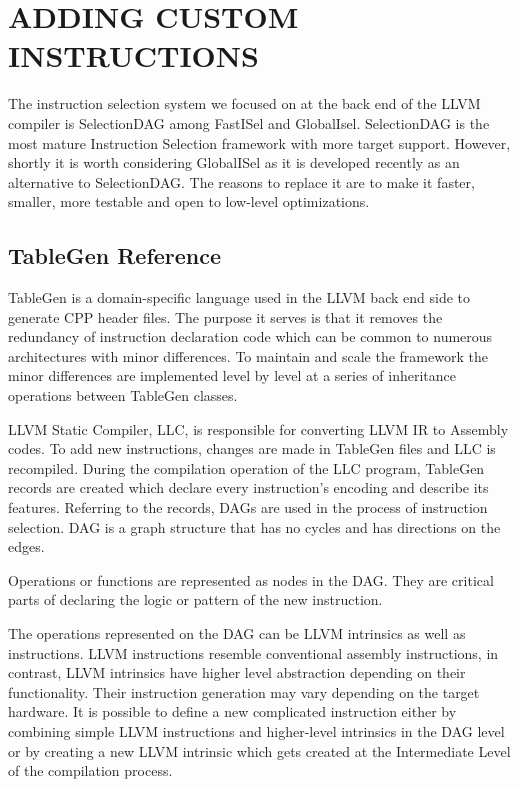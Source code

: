 \clearpage
\chapter{ADDING CUSTOM INSTRUCTIONS}\label{ch:custom_instr}
The instruction selection system we focused on at the back end of the LLVM compiler is SelectionDAG among FastISel and GlobalIsel. SelectionDAG is the most mature Instruction Selection framework with more target support. However, shortly it is worth considering GlobalISel as it is developed recently as an alternative to SelectionDAG. The reasons to replace it are to make it faster, smaller, more testable and open to low-level optimizations.
\section{TableGen Reference}
TableGen is a domain-specific language used in the LLVM back end side to generate CPP header files. The purpose it serves is that it removes the redundancy of instruction declaration code which can be common to numerous architectures with minor differences. To maintain and scale the framework the minor differences are implemented level by level at a series of inheritance operations between TableGen classes. 

\par
 LLVM Static Compiler, LLC, is responsible for converting LLVM IR to Assembly codes. To add new instructions, changes are made in TableGen files and LLC is recompiled. During the compilation operation of the LLC program, TableGen records are created which declare every instruction’s encoding and describe its features. Referring to the records, DAGs are used in the process of instruction selection. 
 DAG is a graph structure that has no cycles and has directions on the edges.

 Operations or functions are represented as nodes in the DAG. They are critical parts of declaring the logic or pattern of the new instruction. 
\par

The operations represented on the DAG can be LLVM intrinsics as well as instructions. LLVM instructions resemble conventional assembly instructions, in contrast, LLVM intrinsics have higher level abstraction depending on their functionality. Their instruction generation may vary depending on the target hardware. It is possible to define a new complicated instruction either by combining simple LLVM instructions and higher-level intrinsics in the DAG level or by creating a new LLVM intrinsic which gets created at the Intermediate Level of the compilation process.

